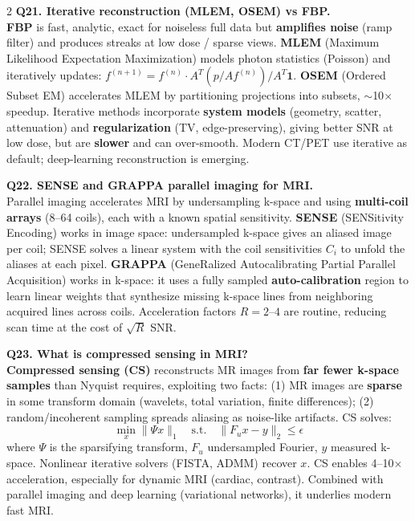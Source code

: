 \begin{paracol}{2}
\textbf{Q21. Iterative reconstruction (MLEM, OSEM) vs FBP.}\\
\textbf{FBP} is fast, analytic, exact for noiseless full data but \textbf{amplifies noise} (ramp filter) and produces streaks at low dose / sparse views. \textbf{MLEM} (Maximum Likelihood Expectation Maximization) models photon statistics (Poisson) and iteratively updates: $f^{(n+1)} = f^{(n)} \cdot A^T(p / Af^{(n)}) / A^T \mathbf{1}$. \textbf{OSEM} (Ordered Subset EM) accelerates MLEM by partitioning projections into subsets, $\sim$10$\times$ speedup. Iterative methods incorporate \textbf{system models} (geometry, scatter, attenuation) and \textbf{regularization} (TV, edge-preserving), giving better SNR at low dose, but are \textbf{slower} and can over-smooth. Modern CT/PET use iterative as default; deep-learning reconstruction is emerging.

\textbf{Q22. SENSE and GRAPPA parallel imaging for MRI.}\\
Parallel imaging accelerates MRI by undersampling k-space and using \textbf{multi-coil arrays} (8--64 coils), each with a known spatial sensitivity. \textbf{SENSE} (SENSitivity Encoding) works in image space: undersampled k-space gives an aliased image per coil; SENSE solves a linear system with the coil sensitivities $C_i$ to unfold the aliases at each pixel. \textbf{GRAPPA} (GeneRalized Autocalibrating Partial Parallel Acquisition) works in k-space: it uses a fully sampled \textbf{auto-calibration} region to learn linear weights that synthesize missing k-space lines from neighboring acquired lines across coils. Acceleration factors $R = 2$--$4$ are routine, reducing scan time at the cost of $\sqrt{R}$ SNR.

\textbf{Q23. What is compressed sensing in MRI?}\\
\textbf{Compressed sensing (CS)} reconstructs MR images from \textbf{far fewer k-space samples} than Nyquist requires, exploiting two facts: (1) MR images are \textbf{sparse} in some transform domain (wavelets, total variation, finite differences); (2) random/incoherent sampling spreads aliasing as noise-like artifacts. CS solves:
$$\min_x \|\Psi x\|_1 \quad \text{s.t.} \quad \|F_u x - y\|_2 \leq \epsilon$$
where $\Psi$ is the sparsifying transform, $F_u$ undersampled Fourier, $y$ measured k-space. Nonlinear iterative solvers (FISTA, ADMM) recover $x$. CS enables 4--10$\times$ acceleration, especially for dynamic MRI (cardiac, contrast). Combined with parallel imaging and deep learning (variational networks), it underlies modern fast MRI.


\end{paracol}
